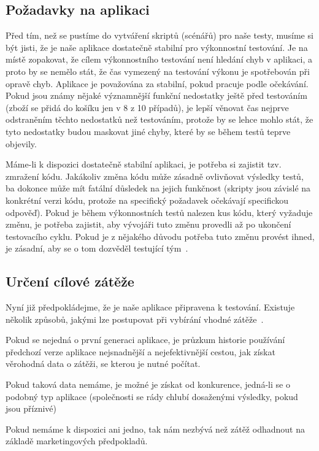 \documentclass[122pt,oneside]{fithesis}
\begin{document}
\subsection{Požadavky na aplikaci}

Před tím, než se pustíme do vytváření skriptů (scénářů) pro naše testy, musíme si být jisti, že je naše aplikace dostatečně stabilní pro výkonnostní testování. Je na místě zopakovat, že cílem výkonnostního testování není hledání chyb v aplikaci, a proto by se nemělo stát, že čas vymezený na testování výkonu je spotřebován při opravě chyb. Aplikace je považována za stabilní, pokud pracuje podle očekávání. Pokud jsou známy nějaké významnější funkční nedostatky ještě před testováním (zboží se přidá do košíku jen v 8 z 10 případů), je lepší věnovat čas nejprve odstraněním těchto nedostatků než testováním, protože by se lehce mohlo stát, že tyto nedostatky budou maskovat jiné chyby, které by se během testů teprve objevily.

Máme-li k dispozici dostatečně stabilní aplikaci, je potřeba si zajistit tzv. zmražení kódu. Jakákoliv změna kódu může zásadně ovlivňovat výsledky testů, ba dokonce může mít fatální důsledek na jejich funkčnost (skripty jsou závislé na konkrétní verzi kódu, protože na specifický požadavek očekávají specifickou odpověď). Pokud je během výkonnostních testů nalezen kus kódu, který vyžaduje změnu, je potřeba zajistit, aby vývojáři tuto změnu provedli až po ukončení testovacího cyklu. Pokud je z nějakého důvodu potřeba tuto změnu provést ihned, je zásadní, aby se o tom dozvěděl testující tým~\cite{molyneaux09}.

\subsection{Určení cílové zátěže}

Nyní již předpokládejme, že je naše aplikace připravena k testování. Existuje několik způsobů, jakými lze postupovat při vybírání vhodné zátěže~\cite{barber11}.

Pokud se nejedná o první generaci aplikace, je průzkum historie používání předchozí verze aplikace nejsnadnější a nejefektivnější cestou, jak získat věrohodná data o zátěži, se kterou je nutné počítat.

Pokud taková data nemáme, je možné je získat od konkurence, jedná-li se o podobný typ aplikace (společnosti se rády chlubí dosaženými výsledky, pokud jsou příznivé)

Pokud nemáme k dispozici ani jedno, tak nám nezbývá než zátěž odhadnout na základě marketingových předpokladů.
\end{document}
